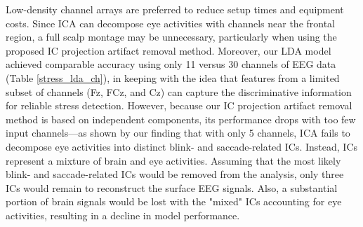 \documentclass[journal]{IEEEtran}
\begin{document}
\par
Low-density channel arrays are preferred to reduce setup times and equipment costs. 
Since ICA can decompose eye activities with channels near the frontal region, a full scalp montage may be unnecessary, particularly when using the proposed IC projection artifact removal method.
Moreover, our LDA model achieved comparable accuracy using only 11 versus 30 channels of EEG data (Table \ref{stress_lda_ch}), in keeping with the idea that features from a limited subset of channels (Fz, FCz, and Cz) can capture the discriminative information for reliable stress detection.
However, because our IC projection artifact removal method is based on independent components, its performance drops with too few input channels—as shown by our finding that with only 5 channels, ICA fails to decompose eye activities into distinct blink- and saccade-related ICs.
Instead, ICs represent a mixture of brain and eye activities.
Assuming that the most likely blink- and saccade-related ICs would be removed from the analysis, only three ICs would remain to reconstruct the surface EEG signals.
Also, a substantial portion of brain signals would be lost with the "mixed" ICs accounting for eye activities, resulting in a decline in model performance.
\end{document}
